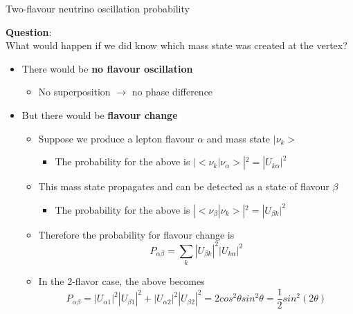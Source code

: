 \begin{frame}{Two-flavour neutrino oscillation probability}

{\bf Question}: \\
What would happen if we did know which mass state was created at the vertex?\\
\vspace{0.3cm}

\begin{itemize}
  \item There would be {\bf no flavour oscillation}
  \begin{itemize}
    \item No superposition $\rightarrow$ no phase difference
  \end{itemize}
  \item But there would be {\bf flavour change}
  \begin{itemize}
    \item Suppose we produce a lepton flavour $\alpha$ and mass state $|\nu_k>$
    \begin{itemize}
      \item The probability for the above is $|<\nu_k|\nu_{\alpha}>|^2=|U_{k\alpha}|^2$
    \end{itemize}
    \item This mass state propagates and can be detected as a state of flavour $\beta$
    \begin{itemize}
      \item The probability for the above is $|<\nu_{\beta}|\nu_{k}>|^2=|U_{\beta k}|^2$
    \end{itemize}
    \item Therefore the probability for flavour change is
    \begin{equation*}
         P_{\alpha \beta} = \sum_k |U_{\beta k}|^2 |U_{k\alpha}|^2
    \end{equation*}
    \item In the 2-flavor case, the above becomes
    \begin{equation*}
         P_{\alpha \beta} =
         |U_{\alpha 1}|^2 |U_{\beta 1}|^2 + |U_{\alpha 2}|^2 |U_{\beta 2}|^2 =
         2 cos^2\theta sin^2\theta = \frac{1}{2} sin^2(2\theta)
    \end{equation*}

  \end{itemize}

\end{itemize}

\end{frame}


